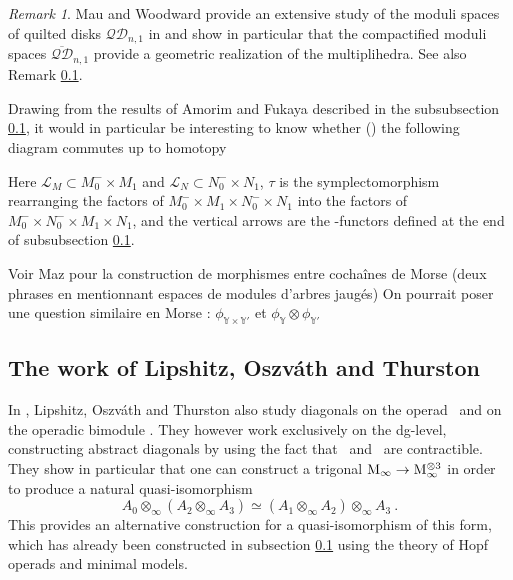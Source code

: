 \documentclass[twoside, 12pt]{amsart}
\theoremstyle{remark}
\newtheorem{remark}[definition]{\sc Remark}
\begin{document}
\begin{remark}
Mau and Woodward provide an extensive study of the moduli spaces of quilted disks $\mathcal{QD}_{n,1}$ in \cite{mau-woodward} and show in particular that the compactified moduli spaces $\overline{\mathcal{QD}}_{n,1}$ provide a geometric realization of the multiplihedra. See also Remark \ref{}.
\end{remark}

Drawing from the results of Amorim and Fukaya described in the subsubsection \ref{}, it would in particular be interesting to know whether () the following diagram commutes up to homotopy
\begin{center} 
\end{center}
Here $\mathcal{L}_M \subset M_0^{-} \times M_1$ and $\mathcal{L}_N \subset N_0^- \times N_1$, $\tau$ is the symplectomorphism rearranging the factors of $M_0^{-} \times M_1 \times N_0^- \times N_1$ into the factors of $M_0^{-} \times N_0^- \times M_1 \times N_1$, and the vertical arrows are the \Ainf -functors defined at the end of subsubsection \ref{}.

Voir Maz pour la construction de morphismes entre cochaînes de Morse (deux phrases en mentionnant espaces de modules d'arbres jaugés)
On pourrait poser une question similaire en Morse : $\phi_{\mathbb{Y} \times \mathbb{Y}'}$ et $\phi_{\mathbb{Y}} \otimes \phi_{\mathbb{Y}'}$

\subsection{The work of Lipshitz, {Oszv\'ath} and Thurston}

In \cite{LOT20}, Lipshitz, Oszv\'ath and Thurston also study diagonals on the operad \Ainf\ and on the operadic bimodule \Minf . They however work exclusively on the dg-level, constructing abstract diagonals by using the fact that \Ainf\ and \Minf\ are contractible. They show in particular that one can construct a trigonal $\mathrm{M}_\infty \rightarrow \mathrm{M}_\infty^{\otimes 3}$ in order to produce a natural quasi-isomorphism
\[ A_0 \otimes_\infty (A_2 \otimes_\infty A_3) \simeq (A_1 \otimes_\infty A_2) \otimes_\infty A_3 \ . \]
This provides an alternative construction for a quasi-isomorphism of this form, which has already been constructed in subsection \ref{} using the theory of Hopf operads and minimal models. 
\end{document}
